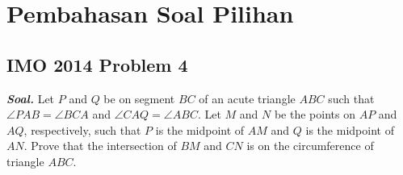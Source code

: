 \documentclass[letterpaper, 13pt]{scrartcl}
\begin{document}
\section{Pembahasan Soal Pilihan}

\subsection{IMO 2014 Problem 4}

\textbf{\textit{Soal. }}Let $P$ and $Q$ be on segment $BC$ of an acute triangle $ABC$ such that $\angle PAB=\angle BCA$ and $\angle CAQ=\angle ABC$. Let $M$ and $N$ be the points on $AP$ and $AQ$, respectively, such that $P$ is the midpoint of $AM$ and $Q$ is the midpoint of $AN$. Prove that the intersection of $BM$ and $CN$ is on the circumference of triangle $ABC$.
\end{document}
